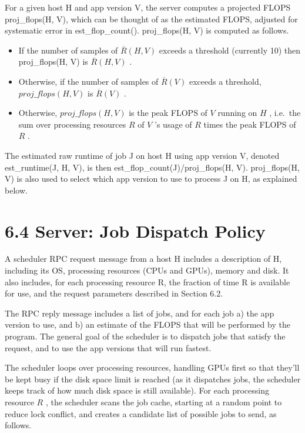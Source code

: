 \documentclass[
]{article}
\providecommand{\tightlist}{%
  \setlength{\itemsep}{0pt}\setlength{\parskip}{0pt}}
\begin{document}
For a given host H and app version V, the server computes a projected
FLOPS proj\_flops(H, V), which can be thought of as the estimated FLOPS,
adjusted for systematic error in est\_flop\_count(). proj\_flops(H, V)
is computed as follows.

\begin{itemize}
\tightlist
\item
  If the number of samples of \(\overline{R}(H, V)\) exceeds a threshold
  (currently 10) then proj\_flops(H, V) is \(\overline{R}(H, V)\) .\\
\item
  Otherwise, if the number of samples of \(\overline{R}(V)\) exceeds a
  threshold, \(proj\_flops(H, V)\) is \(\overline{R}(V)\) .\\
\item
  Otherwise, \(proj\_flops(H, V)\) is the peak FLOPS of \(V\) running on
  \(H\) , i.e.~the sum over processing resources \(R\) of \(V\) 's usage
  of \(R\) times the peak FLOPS of \(R\) .
\end{itemize}

The estimated raw runtime of job J on host H using app version V,
denoted est\_runtime(J, H, V), is then
est\_flop\_count(J)/proj\_flops(H, V). proj\_flops(H, V) is also used to
select which app version to use to process J on H, as explained below.

\section{6.4 Server: Job Dispatch
Policy}\label{server-job-dispatch-policy}

A scheduler RPC request message from a host H includes a description of
H, including its OS, processing resources (CPUs and GPUs), memory and
disk. It also includes, for each processing resource R, the fraction of
time R is available for use, and the request parameters described in
Section 6.2.

The RPC reply message includes a list of jobs, and for each job a) the
app version to use, and b) an estimate of the FLOPS that will be
performed by the program. The general goal of the scheduler is to
dispatch jobs that satisfy the request, and to use the app versions that
will run fastest.

The scheduler loops over processing resources, handling GPUs first so
that they'll be kept busy if the disk space limit is reached (as it
dispatches jobs, the scheduler keeps track of how much disk space is
still available). For each processing resource \(R\) , the scheduler
scans the job cache, starting at a random point to reduce lock conflict,
and creates a candidate list of possible jobs to send, as follows.
\end{document}

